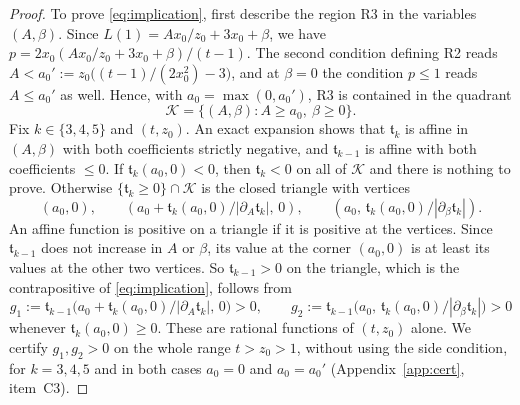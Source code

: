 \documentclass[11pt]{amsart}
\theoremstyle{definition}
\theoremstyle{remark}
\numberwithin{equation}{section}
\begin{document}
\begin{proof}
To prove \eqref{eq:implication}, first describe the region R3 in the variables $(A,\beta)$. Since $L(1)=Ax_0/z_0+3x_0+\beta$,
we have $p=2x_0(Ax_0/z_0+3x_0+\beta)/(t-1)$. The second condition defining R2 reads $A<a_0':=z_0\big((t-1)/(2x_0^2)-3\big)$, and
at $\beta=0$ the condition $p\le1$ reads $A\le a_0'$ as well. Hence, with $a_0=\max(0,a_0')$, R3 is contained in the
quadrant
\[
\mathcal K=\{(A,\beta):A\ge a_0,\ \beta\ge0\}.
\]
Fix $k\in\{3,4,5\}$ and $(t,z_0)$. An exact expansion shows that $\mathfrak t_k$ is affine in $(A,\beta)$ with both
coefficients strictly negative, and $\mathfrak t_{k-1}$ is affine with both coefficients $\le0$. If
$\mathfrak t_k(a_0,0)<0$, then $\mathfrak t_k<0$ on all of $\mathcal K$ and there is nothing to prove. Otherwise
$\{\mathfrak t_k\ge0\}\cap\mathcal K$ is the closed triangle with vertices
\[
(a_0,0),\qquad (a_0+\mathfrak t_k(a_0,0)/|\partial_A\mathfrak t_k|,\,0),\qquad (a_0,\,\mathfrak t_k(a_0,0)/|\partial_\beta\mathfrak t_k|).
\]
An affine function is positive on a triangle if it is positive at the vertices. Since $\mathfrak t_{k-1}$ does not
increase in $A$ or $\beta$, its value at the corner $(a_0,0)$ is at least its values at the other two vertices. So
$\mathfrak t_{k-1}>0$ on the triangle, which is the contrapositive of \eqref{eq:implication}, follows from
\[
g_1:=\mathfrak t_{k-1}\big(a_0+\mathfrak t_k(a_0,0)/|\partial_A\mathfrak t_k|,\,0\big)>0,\qquad
g_2:=\mathfrak t_{k-1}\big(a_0,\,\mathfrak t_k(a_0,0)/|\partial_\beta\mathfrak t_k|\big)>0
\]
whenever $\mathfrak t_k(a_0,0)\ge0$. These are rational functions of $(t,z_0)$ alone. We certify $g_1,g_2>0$ on the
whole range $t>z_0>1$, without using the side condition, for $k=3,4,5$ and in both cases $a_0=0$ and $a_0=a_0'$
(Appendix~\ref{app:cert}, item~C3).
\end{proof}
\end{document}

